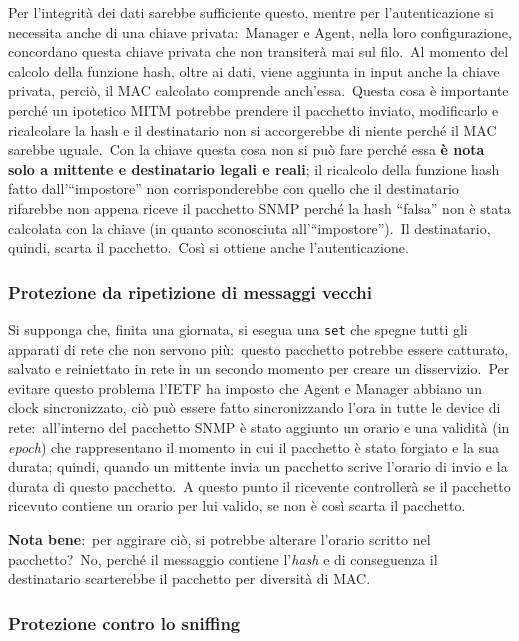 Per l'integrità dei dati sarebbe sufficiente questo, mentre per l'autenticazione si necessita anche di una chiave privata:\ Manager e Agent, nella loro configurazione, concordano questa chiave privata che non transiterà mai sul filo.\
Al momento del calcolo della funzione hash, oltre ai dati, viene aggiunta in input anche la chiave privata, perciò, il MAC calcolato comprende anch'essa.\
Questa cosa è importante perché un ipotetico MITM potrebbe prendere il pacchetto inviato, modificarlo e ricalcolare la hash e il destinatario non si accorgerebbe di niente perché il MAC sarebbe uguale.\
Con la chiave questa cosa non si può fare perché essa \textbf{è nota solo a mittente e destinatario legali e reali}; il ricalcolo della funzione hash fatto dall'``impostore'' non corrisponderebbe con quello che il destinatario rifarebbe non appena riceve il pacchetto SNMP perché la hash ``falsa'' non è stata calcolata con la chiave (in quanto sconosciuta all'``impostore'').\
Il destinatario, quindi, scarta il pacchetto.\
Così si ottiene anche l'autenticazione.

\subsubsection{Protezione da ripetizione di messaggi vecchi}

Si supponga che, finita una giornata, si esegua una \texttt{set} che spegne tutti gli apparati di rete che non servono più:\ questo pacchetto potrebbe essere catturato, salvato e reiniettato in rete in un secondo momento per creare un disservizio.\
Per evitare questo problema l'IETF ha imposto che Agent e Manager abbiano un clock sincronizzato, ciò può essere fatto sincronizzando l'ora in tutte le device di rete:\ all'interno del pacchetto SNMP è stato aggiunto un orario e una validità (in \textit{epoch}) che rappresentano il momento in cui il pacchetto è stato forgiato e la sua durata; quindi, quando un mittente invia un pacchetto scrive l'orario di invio e la durata di questo pacchetto.\
A questo punto il ricevente controllerà se il pacchetto ricevuto contiene un orario per lui valido, se non è così scarta il pacchetto.\

\textbf{Nota bene}:\ per aggirare ciò, si potrebbe alterare l'orario scritto nel pacchetto?\
No, perché il messaggio contiene l'\textit{hash} e di conseguenza il destinatario scarterebbe il pacchetto per diversità di MAC.

\subsubsection{Protezione contro lo sniffing}

